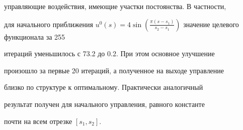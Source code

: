 управляющие воздействия, имеющие участки постоянства. В частности,


для начального приближения $u^0 (s) = 4 \sin \left( \frac {\pi (s


-s_1)}{s_2 - s_1} \right)$ значение целевого функционала за 255


итераций уменьшилось с 73.2 до 0.2. При этом основное улучшение


произошло за первые 20 итераций, а полученное на выходе управление


близко по структуре к оптимальному. Практически аналогичный


результат получен для начального управления, равного константе


почти на всем отрезке $[s_1, s_2]$.





